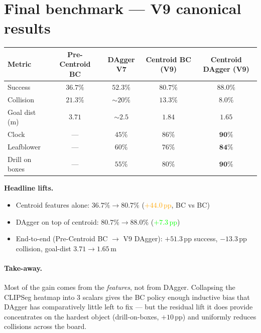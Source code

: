 \documentclass[11pt, a4paper]{article}
\begin{document}
\section{Final benchmark --- V9 canonical results}

\begin{center}
\small
\begin{tabular}{lcccc}
\toprule
\textbf{Metric} & \textbf{Pre-Centroid BC} & \textbf{DAgger V7} & \textbf{Centroid BC (V9)} & \textbf{Centroid DAgger (V9)} \\
\midrule
Success           & $36.7\%$ & $52.3\%$ & $80.7\%$ & $\mathbf{88.0\%}$ \\
Collision         & $21.3\%$ & $\sim 20\%$ & $13.3\%$ & $\mathbf{8.0\%}$ \\
Goal dist (m)     & $3.71$ & $\sim 2.5$ & $1.84$ & $\mathbf{1.65}$ \\
Clock             & ---    & $45\%$ & $86\%$ & $\mathbf{90\%}$ \\
Leafblower        & ---    & $60\%$ & $76\%$ & $\mathbf{84\%}$ \\
Drill on boxes    & ---    & $55\%$ & $80\%$ & $\mathbf{90\%}$ \\
\bottomrule
\end{tabular}
\end{center}

\noindent
\textbf{Headline lifts.}
\begin{itemize}
  \item Centroid features alone: $36.7\% \to 80.7\%$ \quad (\textcolor{orange}{$+44.0$\,pp}, BC vs BC)
  \item DAgger on top of centroid: $80.7\% \to 88.0\%$ \quad (\textcolor{lime}{$+7.3$\,pp})
  \item End-to-end (Pre-Centroid BC $\to$ V9 DAgger): \quad
        $\mathbf{+51.3}$\,pp success, $\mathbf{-13.3}$\,pp collision,
        goal-dist $3.71 \to 1.65$\,m
\end{itemize}

\paragraph{Take-away.} Most of the gain comes from the \emph{features},
not from DAgger. Collapsing the CLIPSeg heatmap into 3 scalars gives the BC
policy enough inductive bias that DAgger has comparatively little left to
fix --- but the residual lift it does provide concentrates on the hardest
object (drill-on-boxes, $+10$\,pp) and uniformly reduces collisions across
the board.
\end{document}
